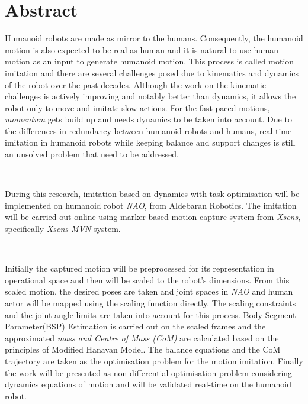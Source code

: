 \documentclass{report}
\begin{document}
   
 
  \section*{Abstract}
   
  Humanoid robots are made as mirror to the humans. Consequently, the humanoid motion is also expected to be real as 
  human and it is natural to use human motion as an input to generate humanoid motion. This process is called motion 
  imitation and there are several challenges posed due to kinematics and dynamics of the robot over the past decades. 
  Although the work on the kinematic challenges is actively improving and notably better than dynamics, it allows the 
  robot only to move and imitate slow actions. For the fast paced motions, \textit{momentum} gets build up and needs 
  dynamics to be taken into account. Due to the differences in redundancy between humanoid robots and humans, real-time 
  imitation in humanoid robots while keeping balance and support changes is still an unsolved problem that need to be 
  addressed.

  ~
  
  During this research, imitation based on dynamics with task optimisation will be implemented on humanoid robot 
  \textit{NAO}, from Aldebaran Robotics. The imitation will be carried out online using marker-based motion capture
   system from \textit{Xsens}, specifically \textit{Xsens MVN} system.
  
  ~
  
  Initially the captured motion will be preprocessed for its representation in operational space and then will be 
  scaled to the robot's dimensions. From this scaled motion, the desired poses are taken and joint spaces in 
  \textit{NAO} and human actor will be mapped using the scaling function directly. The scaling constraints and the 
  joint angle limits are taken into account for this process. Body Segment Parameter(BSP) Estimation is carried out 
  on the scaled frames and the approximated \textit{mass and Centre of Mass (CoM)} are calculated based on the 
  principles of Modified Hanavan Model. The balance equations and the CoM trajectory are taken as the optimisation 
  problem for the motion imitation. Finally the work will be presented as non-differential optimisation problem 
  considering dynamics equations of motion and will be validated real-time on the humanoid robot.
 
 
 \newpage
 
\end{document}
